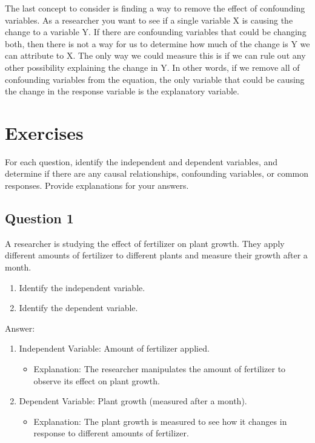 \documentclass[
  letterpaper,
  DIV=11,
  numbers=noendperiod]{scrreprt}
\providecommand{\tightlist}{%
  \setlength{\itemsep}{0pt}\setlength{\parskip}{0pt}}\usepackage{longtable,booktabs,array}
\begin{document}
The last concept to consider is finding a way to remove the effect of
confounding variables. As a researcher you want to see if a single
variable X is causing the change to a variable Y. If there are
confounding variables that could be changing both, then there is not a
way for us to determine how much of the change is Y we can attribute to
X. The only way we could measure this is if we can rule out any other
possibility explaining the change in Y. In other words, if we remove all
of confounding variables from the equation, the only variable that could
be causing the change in the response variable is the explanatory
variable.

\section*{Exercises}\label{exercises-12}


For each question, identify the independent and dependent variables, and
determine if there are any causal relationships, confounding variables,
or common responses. Provide explanations for your answers.

\subsection*{Question 1}\label{question-1}

A researcher is studying the effect of fertilizer on plant growth. They
apply different amounts of fertilizer to different plants and measure
their growth after a month.

\begin{enumerate}
\def\labelenumi{\arabic{enumi}.}
\tightlist
\item
  Identify the independent variable.
\item
  Identify the dependent variable.
\end{enumerate}

Answer:

\begin{enumerate}
\def\labelenumi{\arabic{enumi}.}
\tightlist
\item
  Independent Variable: Amount of fertilizer applied.

  \begin{itemize}
  \tightlist
  \item
    Explanation: The researcher manipulates the amount of fertilizer to
    observe its effect on plant growth.
  \end{itemize}
\item
  Dependent Variable: Plant growth (measured after a month).

  \begin{itemize}
  \tightlist
  \item
    Explanation: The plant growth is measured to see how it changes in
    response to different amounts of fertilizer.
  \end{itemize}
\end{enumerate}
\end{document}

